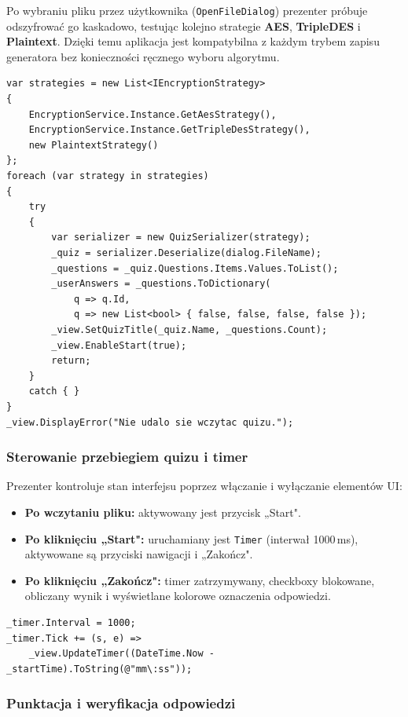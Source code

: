 \documentclass[12pt,a4paper]{article}
\begin{document}
Po wybraniu pliku przez użytkownika (\texttt{OpenFileDialog}) prezenter próbuje
odszyfrować go kaskadowo, testując kolejno strategie \textbf{AES}, \textbf{TripleDES}
i \textbf{Plaintext}. Dzięki temu aplikacja jest kompatybilna z każdym trybem zapisu
generatora bez konieczności ręcznego wyboru algorytmu.

\begin{lstlisting}
var strategies = new List<IEncryptionStrategy>
{
    EncryptionService.Instance.GetAesStrategy(),
    EncryptionService.Instance.GetTripleDesStrategy(),
    new PlaintextStrategy()
};
foreach (var strategy in strategies)
{
    try
    {
        var serializer = new QuizSerializer(strategy);
        _quiz = serializer.Deserialize(dialog.FileName);
        _questions = _quiz.Questions.Items.Values.ToList();
        _userAnswers = _questions.ToDictionary(
            q => q.Id,
            q => new List<bool> { false, false, false, false });
        _view.SetQuizTitle(_quiz.Name, _questions.Count);
        _view.EnableStart(true);
        return;
    }
    catch { }
}
_view.DisplayError("Nie udalo sie wczytac quizu.");
\end{lstlisting}

\subsubsection{Sterowanie przebiegiem quizu i timer}

Prezenter kontroluje stan interfejsu poprzez włączanie i wyłączanie elementów UI:
\begin{itemize}
    \item \textbf{Po wczytaniu pliku:} aktywowany jest przycisk „Start".
    \item \textbf{Po kliknięciu „Start":} uruchamiany jest \texttt{Timer} (interwał 1000\,ms),
          aktywowane są przyciski nawigacji i „Zakończ".
    \item \textbf{Po kliknięciu „Zakończ":} timer zatrzymywany, checkboxy blokowane,
          obliczany wynik i wyświetlane kolorowe oznaczenia odpowiedzi.
\end{itemize}

\begin{lstlisting}
_timer.Interval = 1000;
_timer.Tick += (s, e) =>
    _view.UpdateTimer((DateTime.Now - _startTime).ToString(@"mm\:ss"));
\end{lstlisting}

\subsubsection{Punktacja i weryfikacja odpowiedzi}
\end{document}
